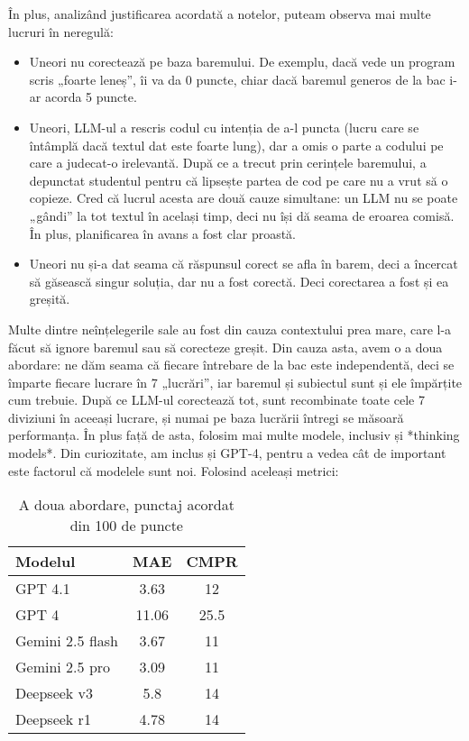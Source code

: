 \documentclass[12pt, a4paper]{report}
\begin{document}
În plus, analizând justificarea acordată a notelor, puteam observa mai multe lucruri în neregulă:
\begin{itemize}
  \item Uneori nu corectează pe baza baremului. De exemplu, dacă vede un program scris „foarte leneș”, îi va da 0 puncte, chiar dacă baremul generos de la bac i-ar acorda 5 puncte.
  \item Uneori, LLM-ul a rescris codul cu intenția de a-l puncta (lucru care se întâmplă dacă textul dat este foarte lung), dar a omis o parte a codului pe care 
  a judecat-o irelevantă. După ce a trecut prin cerințele baremului, a depunctat studentul pentru că lipsește partea de cod pe care nu a vrut să o copieze.
  Cred că lucrul acesta are două cauze simultane: un LLM nu se poate „gândi” la tot textul în același timp, deci nu își dă seama de eroarea comisă. În plus, planificarea în avans a fost clar proastă.
  \item Uneori nu și-a dat seama că răspunsul corect se afla în barem, deci a încercat să găsească singur soluția, dar nu a fost corectă. Deci corectarea a fost și ea greșită.
\end{itemize}


Multe dintre neînțelegerile sale au fost din cauza contextului prea mare, care l-a făcut să ignore baremul sau să corecteze greșit.  
Din cauza asta, avem o a doua abordare: ne dăm seama că fiecare întrebare de la bac este independentă, deci se împarte fiecare lucrare în 7 „lucrări”, iar baremul și subiectul
sunt și ele împărțite cum trebuie. După ce LLM-ul corectează tot, sunt 
recombinate toate cele 7 diviziuni în aceeași lucrare, și numai pe baza lucrării întregi se măsoară performanța. În plus față de asta, folosim mai multe modele, inclusiv și *thinking models*. Din curiozitate, am inclus și GPT-4, pentru a vedea cât de important este factorul că modelele sunt noi.  
Folosind aceleași metrici:


\begin{table}[h!]
\centering
\begin{tabular}{|l|c|c|}
\hline
\textbf{Modelul} & \textbf{MAE} & \textbf{CMPR} \\
\hline
GPT 4.1 & 3.63 & 12\\

\hline
GPT 4 & 11.06 & 25.5 \\
\hline
Gemini 2.5 flash & 3.67 & 11\\


\hline
Gemini 2.5 pro & 3.09 & 11\\
\hline
Deepseek v3  & 5.8 & 14 \\

\hline
Deepseek r1 & 4.78 & 14 
\\
\hline

\end{tabular}
\caption{A doua abordare, punctaj acordat din 100 de puncte}

\end{table}
\end{document}
